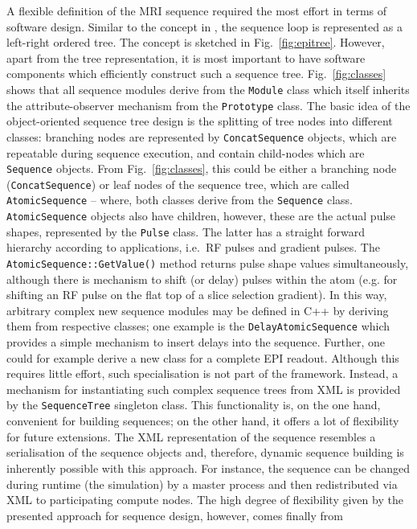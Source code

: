 \documentclass[journal,onecolumn,12pt]{IEEEtran}
\begin{document}
A flexible definition of the MRI sequence required the most effort in terms of software design. Similar to the concept
in \cite{joch}, the sequence loop is represented as a left-right ordered tree. The concept is sketched in
Fig.~\ref{fig:epitree}. However, apart from the tree representation, it is most important to have software components
which efficiently construct such a sequence tree. Fig.~\ref{fig:classes} shows that all sequence modules derive from the
\verb+Module+ class which itself inherits the attribute-observer mechanism from the \verb+Prototype+ class. The basic
idea of the object-oriented sequence tree design is the splitting of tree nodes into different classes: branching nodes
are represented by \verb+ConcatSequence+ objects, which are repeatable during sequence execution, and contain
child-nodes which are \verb+Sequence+ objects. From Fig.~\ref{fig:classes}, this could be either a branching node
(\verb+ConcatSequence+) or leaf nodes of the sequence tree, which are called \verb+AtomicSequence+ -- where, both
classes derive from the \verb+Sequence+ class. \verb+AtomicSequence+ objects also have children, however, these are the
actual pulse shapes, represented by the \verb+Pulse+ class. The latter has a straight forward hierarchy according to
applications, i.e.~RF pulses and gradient pulses. The \verb+AtomicSequence::GetValue()+ method returns pulse shape
values simultaneously, although there is mechanism to shift (or delay) pulses within the atom (e.g. for shifting an RF
pulse on the flat top of a slice selection gradient). In this way, arbitrary complex new sequence modules may be defined
in C++ by deriving them from respective classes; one example is the \verb+DelayAtomicSequence+ which provides a simple
mechanism to insert delays into the sequence. Further, one could for example derive a new class for a complete EPI
readout. Although this requires little effort, such specialisation is not part of the framework. Instead, a mechanism
for instantiating such complex sequence trees from XML is provided by the \verb+SequenceTree+ singleton class. This
functionality is, on the one hand, convenient for building sequences; on the other hand, it offers a lot of flexibility
for future extensions. The XML representation of the sequence resembles a serialisation of the sequence objects and,
therefore, dynamic sequence building is inherently possible with this approach. For instance, the sequence can be
changed during runtime (the simulation) by a master process and then redistributed via XML to participating compute
nodes. The high degree of flexibility given by the presented approach for sequence design, however, comes finally from
\end{document}
